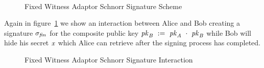 \begin{figure}
{{{                \pcreturn \procFinSig{\varSigAlice}{\varSigAptBob}{\varRandAlice}{\varRandBob}
            } \\[2\baselineskip]
            \procedure[linenumbering, syntaxhighlight=auto]{$\procExtWit{\varSigFin}{\varSigAlice}{\varSigAptBob}$}{
                \varSigBob \opAssign \varSigFin \opSub \varSigAlice \\
                \varWit \opAssign \varSigAptBob \opSub \varSigBob \\
                \pcreturn (\varWit)
            }
        }
    }
    \caption{Fixed Witness Adaptor Schnorr Signature Scheme}
\end{figure}

Again in figure~\ref{fig:aptSchnorrInteraction} we show an interaction between Alice and Bob creating a signature $\sigma_{\mathit{fin}}$ for the composite public key $\mathit{pk}_{\mathit{B}} ~:=~ \mathit{pk}_{\mathit{A}} ~\cdot~ \mathit{pk}_{\mathit{B}}$
while Bob will hide his secret $\mathit{x}$ which Alice can retrieve after the signing process has completed.

\begin{figure}\label{fig:aptSchnorrInteraction}
    \caption{Fixed Witness Adaptor Schnorr Signature Interaction}
\end{figure}

